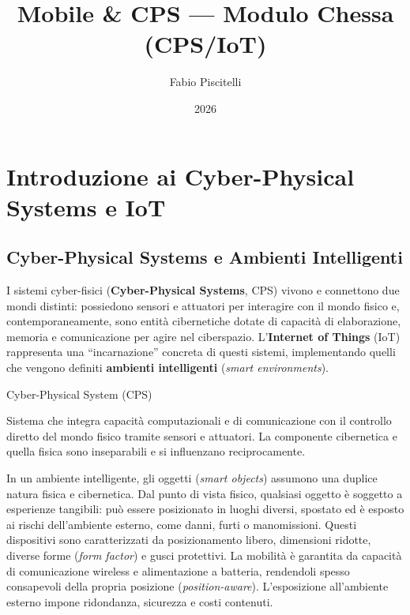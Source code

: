 \documentclass[
  italian,
  openany]{book}
\title{Mobile \& CPS --- Modulo Chessa (CPS/IoT)}
\author{Fabio Piscitelli}
\date{2026}
\begin{document}
\frontmatter
\maketitle

{
\setcounter{tocdepth}{1}
\tableofcontents
}
\mainmatter
\chapter{Introduzione ai Cyber-Physical Systems e
IoT}\label{introduzione-ai-cyber-physical-systems-e-iot}

\section{Cyber-Physical Systems e Ambienti
Intelligenti}\label{cyber-physical-systems-e-ambienti-intelligenti}

I sistemi cyber-fisici (\textbf{Cyber-Physical Systems}, CPS) vivono e
connettono due mondi distinti: possiedono sensori e attuatori per
interagire con il mondo fisico e, contemporaneamente, sono entità
cibernetiche dotate di capacità di elaborazione, memoria e comunicazione
per agire nel ciberspazio. L'\textbf{Internet of Things} (IoT)
rappresenta una ``incarnazione'' concreta di questi sistemi,
implementando quelli che vengono definiti \textbf{ambienti intelligenti}
(\emph{smart environments}).

\begin{calloutdefinition}{Cyber-Physical System (CPS)}

Sistema che integra capacità computazionali e di comunicazione con il
controllo diretto del mondo fisico tramite sensori e attuatori. La
componente cibernetica e quella fisica sono inseparabili e si
influenzano reciprocamente.

\end{calloutdefinition}

In un ambiente intelligente, gli oggetti (\emph{smart objects}) assumono
una duplice natura fisica e cibernetica. Dal punto di vista fisico,
qualsiasi oggetto è soggetto a esperienze tangibili: può essere
posizionato in luoghi diversi, spostato ed è esposto ai rischi
dell'ambiente esterno, come danni, furti o manomissioni. Questi
dispositivi sono caratterizzati da posizionamento libero, dimensioni
ridotte, diverse forme (\emph{form factor}) e gusci protettivi. La
mobilità è garantita da capacità di comunicazione wireless e
alimentazione a batteria, rendendoli spesso consapevoli della propria
posizione (\emph{position-aware}). L'esposizione all'ambiente esterno
impone ridondanza, sicurezza e costi contenuti.
\end{document}
